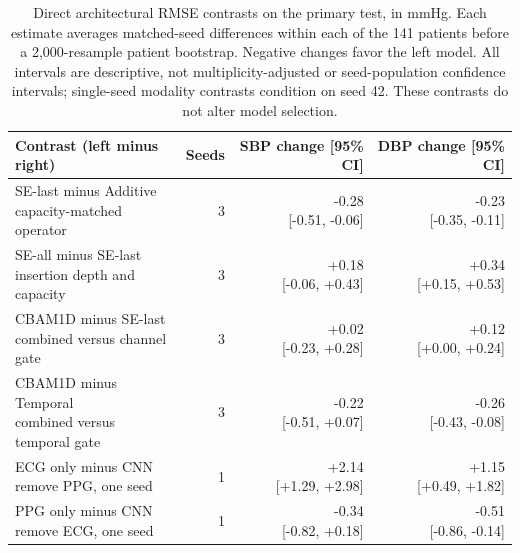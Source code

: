 \documentclass[11pt]{article}
\begin{document}
\begin{table}[t]\centering\scriptsize\setlength{\tabcolsep}{4pt}\renewcommand{\arraystretch}{1.15}
\begin{tabular}{lrrr}\toprule
Contrast (left minus right) & Seeds & SBP change [95\% CI] & DBP change [95\% CI]\\\midrule
\shortstack{SE-last minus Additive\\{capacity-matched operator}} & 3 & \shortstack{-0.28\\{[-0.51, -0.06]}} & \shortstack{-0.23\\{[-0.35, -0.11]}}\\
\shortstack{SE-all minus SE-last\\{insertion depth and capacity}} & 3 & \shortstack{+0.18\\{[-0.06, +0.43]}} & \shortstack{+0.34\\{[+0.15, +0.53]}}\\
\shortstack{CBAM1D minus SE-last\\{combined versus channel gate}} & 3 & \shortstack{+0.02\\{[-0.23, +0.28]}} & \shortstack{+0.12\\{[+0.00, +0.24]}}\\
\shortstack{CBAM1D minus Temporal\\{combined versus temporal gate}} & 3 & \shortstack{-0.22\\{[-0.51, +0.07]}} & \shortstack{-0.26\\{[-0.43, -0.08]}}\\
\shortstack{ECG only minus CNN\\{remove PPG, one seed}} & 1 & \shortstack{+2.14\\{[+1.29, +2.98]}} & \shortstack{+1.15\\{[+0.49, +1.82]}}\\
\shortstack{PPG only minus CNN\\{remove ECG, one seed}} & 1 & \shortstack{-0.34\\{[-0.82, +0.18]}} & \shortstack{-0.51\\{[-0.86, -0.14]}}\\
\bottomrule\end{tabular}
\caption{Direct architectural RMSE contrasts on the primary test, in mmHg. Each estimate averages matched-seed differences within each of the 141 patients before a 2,000-resample patient bootstrap. Negative changes favor the left model. All intervals are descriptive, not multiplicity-adjusted or seed-population confidence intervals; single-seed modality contrasts condition on seed 42. These contrasts do not alter model selection.}\end{table}
\end{document}

